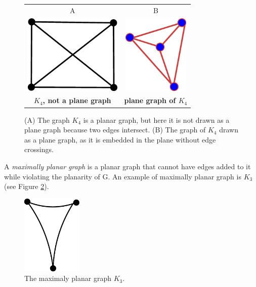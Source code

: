 \begin{figure}[h]
	\centering
	\begin{tabular}{c|c}
		\hline
		A & B\\
		\includegraphics[height=1.5in]{k4_cross.eps} & \includegraphics[height=1.5in]{k4.eps} \\ 
		\textbf{$K_4$, not a plane graph} & \textbf{plane graph of $K_4$} \\
		\hline
	\end{tabular}
	\caption{(A) The graph  $K_4$ is a planar graph, but here it is not drawn as a plane graph because two edges intersect. (B) The graph of $K_4$ drawn as a plane graph, as it is embedded in the plane without edge crossings.}
\label{k4_plane}
\end{figure}
A \emph{maximally planar graph} is a planar graph that cannot have edges added to it while violating the planarity of G. An example of maximally planar graph is $K_3$ (see Figure \ref{fig3}).

\begin{figure}
	\centering
\includegraphics[height=1.5in]{k3_max.eps}
\caption{The maximaly planar graph $K_3$.}
\label{fig3}
\end{figure}

